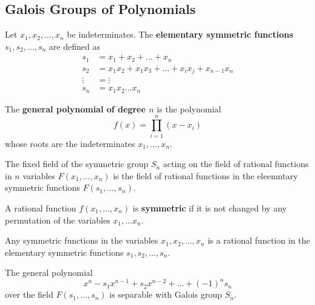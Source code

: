 \subsection{Galois Groups of Polynomials} 

  \begin{definition} 
    Let $x_1, x_2, \ldots, x_n$ be indeterminates. The \textbf{elementary symmetric functions} $s_1, s_2, \ldots, s_n$ are defined as 
    \begin{align}
      s_1 & = x_1 + x_2 + \ldots + x_n \\ 
      s_2 & = x_1 x_2 + x_1 x_3 + \ldots + x_i x_j + x_{n-1} x_n \\ 
      \vdots & = \vdots \\
      s_n & = x_1 x_2 \ldots x_n
    \end{align}
  \end{definition}

  \begin{definition}
    The \textbf{general polynomial of degree $n$} is the polynomial 
    \begin{equation}
      f(x) = \prod_{i=1}^n (x - x_i)
    \end{equation}
    whose roots are the indeterminates $x_1, \ldots, x_n$.  
  \end{definition}

  \begin{theorem}
    The fixed field of the symmetric group $S_n$ acting on the field of rational functions in $n$ variables $F(x_1, \ldots, x_n)$ is the field of rational functions in the eleemntary symmetric functions $F(s_1, \ldots, s_n)$. 
  \end{theorem}

  \begin{definition}[Symmetric]
    A rational function $f(x_1, \ldots, x_n)$ is \textbf{symmetric} if it is not changed by any permutation of the variables $x_1, \ldots x_n$. 
  \end{definition}

  \begin{theorem}
    Any symmetric functions in the variables $x_1, x_2, \ldots, x_n$ is a rational function in the elementary symmetric functions $s_1, s_2, \ldots, s_n$. 
  \end{theorem}

  \begin{theorem}
    The general polynomial 
    \begin{equation}
      x^n - s_1 x^{n-1} + s_2 x^ {n-2} + \ldots + (-1)^n s_n 
    \end{equation}
    over the field $F(s_1, \ldots, s_n)$ is separable with Galois group $S_n$. 
  \end{theorem}

